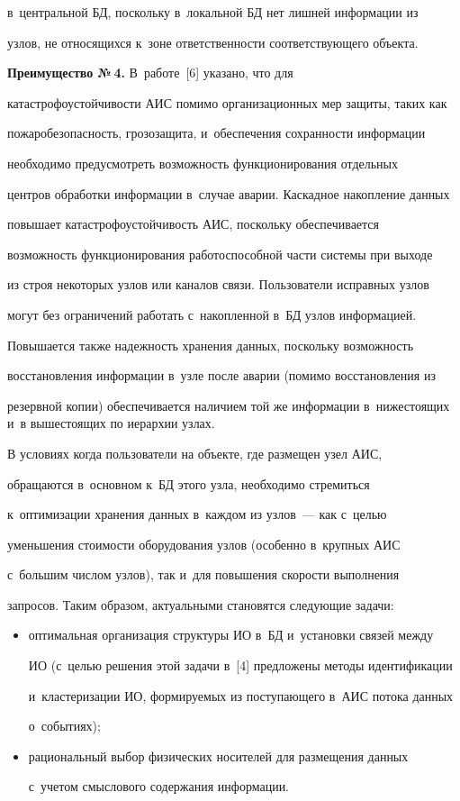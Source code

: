 в~центральной БД, поскольку в~локальной БД нет лишней информации из 


узлов, не относящихся к~зоне ответственности соответствующего объекта.


  


  \textbf{Преимущество №\,4.} В~работе~[6] указано, что для 


катастрофоустойчивости АИС помимо организационных мер защиты, таких как 


пожаробезопасность, грозозащита, и~обеспечения сохранности информации 


необходимо преду\-смот\-реть возможность функционирования отдельных 


центров обработки информации в~случае аварии. Каскадное накопление данных 


повышает катастрофоустойчивость АИС, поскольку обеспечивается 


возможность функционирования работоспособной части системы при выходе 


из строя некоторых узлов или каналов связи. Пользователи исправных узлов 


могут без ограничений работать с~накопленной в~БД узлов информацией. 


Повышается также надежность хранения данных, поскольку возможность 


восстановления информации в~узле после аварии (помимо восстановления из 


резервной копии) обеспечивается наличием той же информации в~нижестоящих и~в вышестоящих по иерархии узлах. 


  


  В условиях когда пользователи на объекте, где размещен узел АИС, 


обращаются в~основном к~БД этого узла, необходимо стремиться 


к~оптимизации хранения данных в~каждом из узлов~--- как с~целью 


уменьшения стоимости оборудования узлов (особенно в~крупных АИС 


с~большим числом узлов), так и~для повышения скорости выполнения 


запросов. Таким образом, актуальными становятся следующие задачи:


  \begin{itemize}


\item оптимальная организация структуры ИО в~БД и~установки связей между 


ИО (с~целью решения этой задачи в~[4] предложены методы идентификации 


и~кластеризации ИО, формируемых из поступающего в~АИС потока данных 


о~событиях);


\item рациональный выбор физических носителей для размещения данных 


с~учетом смыслового содержания информации.


\end{itemize}





